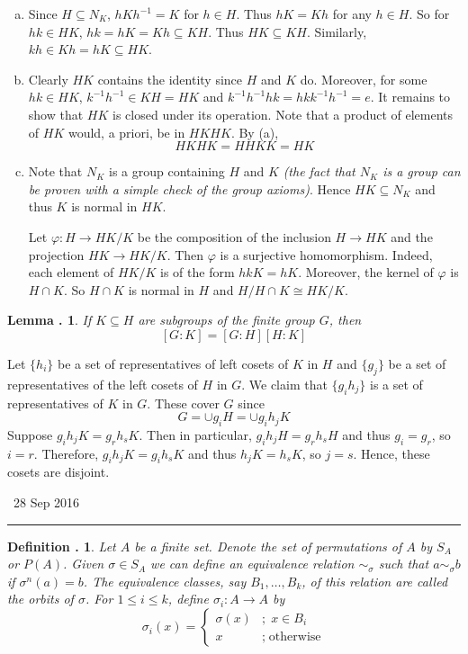 \documentclass[twoside]{report}
\newcounter{Lecture}
\newcommand{\newLec}[1]{
  \stepcounter{Lecture}
  \noindent{\Large\bf Lecture \arabic{Lecture}} \, #1 \hfill  \rule[1ex]{2.5in}{.1pt} \vspace{1em}
}
\theoremstyle{myts}
\newcounter{c}[Lecture]
\newtheorem{dfn}[c]{Definition \arabic{Lecture}.}
\newtheorem{lma}[c]{Lemma \arabic{Lecture}.}
\newcounter{ex}
\newenvironment{prf}{
  \noindent\begin{mdframed}[style=prf]}{\end{mdframed} \vspace{1em}
}
\begin{document}
\begin{prf}
  \begin{enumerate}[(a)]
    \item Since $H\subseteq N_K$, $hKh^{-1} = K$ for $h\in H$. Thus $hK=Kh$ for any $h\in H$. So for $hk\in HK$, $hk = hK = Kh \subseteq KH$. Thus $HK\subseteq KH$. Similarly, $kh\in Kh = hK \subseteq HK$.

    \item Clearly $HK$ contains the identity since $H$ and $K$ do. Moreover, for some $hk\in HK$, $k^{-1}h^{-1}\in KH=HK$ and $k^{-1}h^{-1} hk = hk k^{-1}h^{-1} = e$. It remains to show that $HK$ is closed under its operation. Note that a product of elements of $HK$ would, a priori, be in $HKHK$. By (a),
    \[
      HKHK = HHKK = HK
    \]

    \item Note that $N_K$ is a group containing $H$ and $K$ \emph{(the fact that $N_K$ is a group can be proven with a simple check of the group axioms)}. Hence $HK\subseteq N_K$ and thus $K$ is normal in $HK$.

    Let $\varphi:H\to HK/K$ be the composition of the inclusion $H\to HK$ and the projection $HK \to HK/K$. Then $\varphi$ is a surjective homomorphism. Indeed, each element of \( HK/K \) is of the form \( hkK = hK \). Moreover, the kernel of $\varphi$ is $H\cap K$. So $H\cap K$ is normal in $H$ and $H/H\cap K \cong HK/K$.
  \end{enumerate}
\end{prf}

\begin{lma}
  If \( K\subseteq H \) are subgroups of the finite group $G$, then
  \[
    [G:K] = [G:H][H:K]
  \]
\end{lma}

\begin{prf}
  Let \( \{ h_i \} \) be a set of representatives of left cosets of $K$ in $H$ and \( \{ g_j \} \) be a set of representatives of the left cosets of $H$ in $G$. We claim that \( \{ g_ih_j \} \) is a set of representatives of $K$ in $G$. These cover $G$ since
  \[
    G = \cup g_i H = \cup g_i h_j K
  \]
  Suppose \( g_i h_j K = g_r h_s K \). Then in particular, \( g_i h_j H = g_r h_s H \) and thus \( g_i = g_r \), so \(i=r\). Therefore, \( g_i h_j K = g_i h_s K\) and thus \( h_j K = h_s K\), so \( j = s \). Hence, these cosets are disjoint.
\end{prf}

\newLec{28 Sep 2016}

\begin{dfn}
  Let $A$ be a finite set. Denote the \emph{set of permutations} of $A$ by $S_A$ or $P(A)$. Given \(\sigma\in S_A\) we can define an equivalence relation \( \sim_\sigma \) such that \( a\sim_\sigma b\) if \( \sigma^n (a) = b \). The equivalence classes, say $B_1,\ldots,B_k$, of this relation are called the \emph{orbits} of $\sigma$. For $1\leq i \leq k$, define \( \sigma_i : A \to A \) by
  \[
    \sigma_i(x) =
    \begin{cases}
      \sigma(x) &;\; x\in B_i \\
      x &;\; \textrm{otherwise}
    \end{cases}
  \]
\end{dfn}
\end{document}

